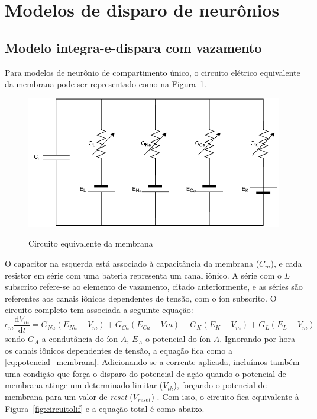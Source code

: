 \section{Modelos de disparo de neurônios}\label{sec:modelosdisparo}
\subsection{Modelo integra-e-dispara com vazamento}\label{sec:modelolif}

Para modelos de neurônio de compartimento único, o circuito elétrico equivalente da membrana pode ser representado como na Figura~\ref{fig:circuitomembrana}.
\begin{figure}[htb!]
	\centering
	\caption{Circuito equivalente da membrana}
	\label{fig:circuitomembrana}
	\includegraphics[width=0.7\linewidth]{figs/circuito_membrana}\\
	\cite{lapicque_recherches_1907}
\end{figure}
O capacitor na esquerda está associado à capacitância da membrana ($C_m$), e cada resistor em série com uma bateria representa um canal iônico. A série com o $L$ subscrito refere-se ao elemento de vazamento, citado anteriormente, e as séries são referentes aos canais iônicos dependentes de tensão, com o íon subscrito. O circuito completo tem associada a seguinte equação:
\begin{equation}\label{eq:potencial_membrana_total}
	c_m\frac{\mathrm{d}V_m}{\mathrm{d}t}=G_{Na}(E_{Na}-V_m)+G_{Ca}(E_{Ca}-Vm)+G_K(E_K-V_m)+G_L(E_L-V_m)
\end{equation}
sendo $G_A$ a condutância do íon $A$, $E_A$ o potencial do íon $A$. Ignorando por hora os canais iônicos dependentes de tensão, a equação fica como a \ref{eq:potencial_membrana}. Adicionando-se a corrente aplicada, incluímos também uma condição que força o disparo do potencial de ação quando o potencial de membrana atinge um determinado limitar ($V_{th}$), forçando o potencial de membrana para um valor de \textit{reset} ($V_{reset}$) \cite{miller_introductory_2018}. Com isso, o circuito fica equivalente à Figura~\ref{fig:circuitolif} e a equação total é como abaixo.
